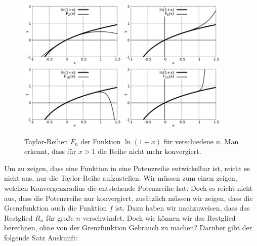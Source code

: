 \begin{figure}
    \centering
    \includegraphics[width=0.45\textwidth]{./gnuplot/taylor-expansion-log-1}
    \includegraphics[width=0.45\textwidth]{./gnuplot/taylor-expansion-log-2}
    \includegraphics[width=0.45\textwidth]{./gnuplot/taylor-expansion-log-3}
    \includegraphics[width=0.45\textwidth]{./gnuplot/taylor-expansion-log-4}
    \caption{Taylor-Reihen $F_n$ der Funktion $\ln(1+x)$ für verschiedene $n$. Man erkennt, dass für $x>1$ die Reihe nicht mehr konvergiert.}
    \label{fig:ExTaylorLog}
\end{figure}

Um zu zeigen, dass eine Funktion in eine Potenzreihe entwickelbar ist, reicht es nicht aus, nur die Taylor-Reihe aufzustellen. Wir müssen zum einen zeigen, welchen Konvergenzradius die entstehende Potenzreihe hat. Doch es reicht nicht aus, dass die Potenzreihe nur konvergiert, zusätzlich müssen wir zeigen, dass die Grenzfunktion auch die Funktion $f$ ist. Dazu haben wir nachzuweisen, dass das Restglied $R_n$ für große $n$ verschwindet. Doch wie können wir das Restglied berechnen, ohne von der Grenzfunktion Gebrauch zu machen? Darüber gibt der folgende Satz Auskunft:

